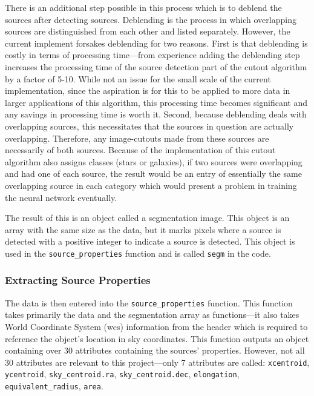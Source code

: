 \documentclass[a4paper,fleqn,usenatbib]{mnras}
\begin{document}
There is an additional step possible in this process which is to deblend the sources after detecting sources. Deblending is the process in which overlapping sources are distinguished from each other and listed separately. However, the current implement forsakes deblending for two reasons. First is that deblending is costly in terms of processing time---from experience adding the deblending step increases the processing time of the source detection part of the cutout algorithm by a factor of 5-10. While not an issue for the small scale of the current implementation, since the aspiration is for this to be applied to more data in larger applications of this algorithm, this processing time becomes significant and any savings in processing time is worth it. Second, because deblending deals with overlapping sources, this necessitates that the sources in question are actually overlapping. Therefore, any image-cutouts made from these sources are necessarily of both sources. Because of the implementation of this cutout algorithm also assigns classes (stars or galaxies), if two sources were overlapping and had one of each source, the result would be an entry of essentially the same overlapping source in each category which would present a problem in training the neural network eventually. 

The result of this is an object called a segmentation image. This object is an array with the same size as the data, but it marks pixels where a source is detected with a positive integer to indicate a source is detected.  This object is used in the \texttt{source\_properties} function and is called \texttt{segm} in the code. 

\subsubsection{Extracting Source Properties}
The data is then entered into the \texttt{source\_properties} function. This function takes primarily the data and the segmentation array as functions---it also takes World Coordinate System (wcs) information from the header which is required to reference the object's location in sky coordinates. This function outputs an object containing over 30 attributes containing the sources' properties. However, not all 30 attributes are relevant to this project---only 7 attributes are called: \texttt{xcentroid}, \texttt{ycentroid}, \texttt{sky\_centroid.ra}, \texttt{sky\_centroid.dec}, \texttt{elongation}, \lstinline{equivalent_radius}, \texttt{area}. 
\end{document}
